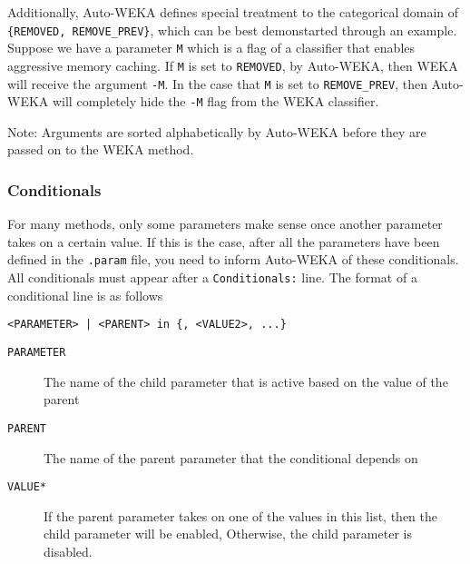Additionally, Auto-WEKA defines special treatment to the categorical domain of \texttt{\{REMOVED, REMOVE\_PREV\}}, which can be best demonstarted through an example. Suppose we have a parameter \texttt{M} which is a flag of a classifier that enables aggressive memory caching. If \texttt{M} is set to \texttt{REMOVED}, by Auto-WEKA, then WEKA will receive the argument \texttt{-M}. In the case that \texttt{M} is set to \texttt{REMOVE\_PREV}, then Auto-WEKA will completely hide the \texttt{-M} flag from the WEKA classifier.

\begin{aside}
 Note: Arguments are sorted alphabetically by Auto-WEKA before they are passed on to the WEKA method.
\end{aside}

\subsubsection{Conditionals}

For many methods, only some parameters make sense once another parameter takes on a certain value. If this is the case, after all the parameters have been defined in the \texttt{.param} file, you need to inform Auto-WEKA of these conditionals. All conditionals must appear after a \texttt{Conditionals:} line. The format of a conditional line is as follows

\begin{center}
 \texttt{<PARAMETER> | <PARENT> in \{<VALUE1>, <VALUE2>, ...\}}
\end{center}

\begin{description}
  \item[\texttt{PARAMETER}] The name of the child parameter that is active based on the value of the parent
  \item[\texttt{PARENT}] The name of the parent parameter that the conditional depends on
  \item[\texttt{VALUE*}] If the parent parameter takes on one of the values in this list, then the child parameter will be enabled, Otherwise, the child parameter is disabled.
\end{description}



